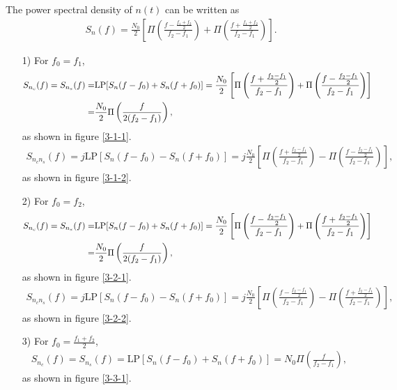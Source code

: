 \documentclass{assignment}
\begin{document}
\begin{sol}
    The power spectral density of $n(t)$ can be written as
    \begin{align}
        S_n(f)=\frac{N_0}{2}\left[\Pi\left(\frac{f-\frac{f_1+f_2}{2}}{f_2-f_1}\right)+\Pi\left(\frac{f+\frac{f_1+f_2}{2}}{f_2-f_1}\right)\right].
    \end{align}
    \begin{itemize}
        \item[1)] For $f_0=f_1$,
        \begin{align}
            \notag S_{n_c}(f)=S_{n_s}(f)=&\text{LP}[S_n(f-f_0)+S_n(f+f_0)]=\frac{N_0}{2}\left[\Pi\left(\frac{f+\frac{f_2-f_1}{2}}{f_2-f_1}\right)+\Pi\left(\frac{f-\frac{f_2-f_1}{2}}{f_2-f_1}\right)\right]\\
            =&\frac{N_0}{2}\Pi\left(\frac{f}{2(f_2-f_1)}\right),
        \end{align}
        as shown in figure \ref{3-1-1}.
        \begin{align}
            S_{n_cn_s}(f)=j\text{LP}[S_n(f-f_0)-S_n(f+f_0)]=j\frac{N_0}{2}\left[\Pi\left(\frac{f+\frac{f_2-f_1}{2}}{f_2-f_1}\right)-\Pi\left(\frac{f-\frac{f_2-f_1}{2}}{f_2-f_1}\right)\right],
        \end{align}
        as shown in figure \ref{3-1-2}.
        \item[2)] For $f_0=f_2$,
        \begin{align}
            \notag S_{n_c}(f)=S_{n_s}(f)=&\text{LP}[S_n(f-f_0)+S_n(f+f_0)]=\frac{N_0}{2}\left[\Pi\left(\frac{f-\frac{f_2-f_1}{2}}{f_2-f_1}\right)+\Pi\left(\frac{f+\frac{f_2-f_1}{2}}{f_2-f_1}\right)\right]\\
            =&\frac{N_0}{2}\Pi\left(\frac{f}{2(f_2-f_1)}\right),
        \end{align}
        as shown in figure \ref{3-2-1}.
        \begin{align}
            S_{n_cn_s}(f)=j\text{LP}[S_n(f-f_0)-S_n(f+f_0)]=j\frac{N_0}{2}\left[\Pi\left(\frac{f-\frac{f_2-f_1}{2}}{f_2-f_1}\right)-\Pi\left(\frac{f+\frac{f_2-f_1}{2}}{f_2-f_1}\right)\right],
        \end{align}
        as shown in figure \ref{3-2-2}.
        \item[3)] For $f_0=\frac{f_1+f_2}{2}$,
        \begin{align}
            S_{n_c}(f)=S_{n_s}(f)=\text{LP}\left[S_n(f-f_0)+S_n(f+f_0)\right]=N_0\Pi\left(\frac{f}{f_2-f_1}\right),
        \end{align}
        as shown in figure \ref{3-3-1}.
        \begin{align}

\end{align}
\end{itemize}
\end{sol}
\end{document}
